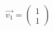 \documentclass[preview]{standalone}
\begin{document}
\begin{align*}
\vec{v_1} = \begin{pmatrix} 1 \\ 1 \end{pmatrix}
\end{align*}
\end{document}
